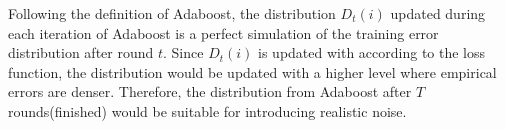 Following the definition of Adaboost, the distribution $D_t(i)$ updated during each iteration of Adaboost is a perfect simulation of the training error distribution after round $t$.
Since $D_t(i)$ is updated with according to the loss function, the distribution would be updated with a higher level where empirical errors are denser.
Therefore, the distribution from Adaboost after $T$ rounds(finished) would be suitable for introducing realistic noise.
